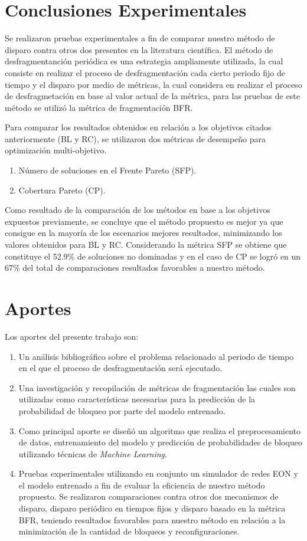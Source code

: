 \section{Conclusiones Experimentales}
Se realizaron pruebas experimentales a fin de comparar nuestro método de disparo contra otros dos presentes en la literatura científica. El método de desfragmentanción periódica es una estrategia ampliamente utilizada, la cual consiste en realizar el proceso de desfragmentación cada cierto periodo fijo de tiempo y el disparo por medio de métricas, la cual considera en realizar el proceso de desfragmetación en base al valor actual de la métrica, para las pruebas de este método se utilizó la métrica de fragmentación BFR.

Para comparar los resultados obtenidos en relación a los objetivos citados anteriormente (BL y RC), se utilizaron dos métricas de desempeño para optimización multi-objetivo.

\begin{enumerate}
    \item Número de soluciones en el Frente Pareto (SFP).
    \item Cobertura Pareto (CP).
\end{enumerate}

Como resultado de la comparación de los métodos en base a los objetivos expuestos previamente, se concluye que el método propuesto es mejor ya que consigue en la mayoría de los escenarios mejores resultados,
minimizando los valores obtenidos para BL y RC. Considerando la métrica SFP se obtiene que constituye el 52.9\% de soluciones no dominadas y en el caso de CP se logró en un 67\% del total de comparaciones resultados favorables a nuestro método.

\section{Aportes}
Los aportes del presente trabajo son:
\begin{enumerate}[label=\arabic*)]
    \item Un análisis bibliográfico sobre el problema relacionado al periodo de tiempo en el que el proceso de desfragmentación será ejecutado.
    \item Una investigación y recopilación de métricas de fragmentación las cuales son utilizadas como características necesarias para la predicción de la probabilidad de bloqueo por parte del modelo entrenado.
    \item Como principal aporte se diseñó un algoritmo que realiza el preprocesamiento de datos, entrenamiento del modelo y predicción de probabilidades de bloqueo utilizando técnicas de \textit{Machine Learning}.
    \item Pruebas experimentales utilizando en conjunto un simulador de redes EON y el modelo entrenado a fin de evaluar la eficiencia de nuestro método propuesto. Se realizaron comparaciones contra otros dos mecanismos de disparo, disparo periódico en tiempos fijos y disparo basado en la métrica BFR, teniendo resultados favorables para nuestro método en relación a la minimización de la cantidad de bloqueos y reconfiguraciones.
\end{enumerate}

